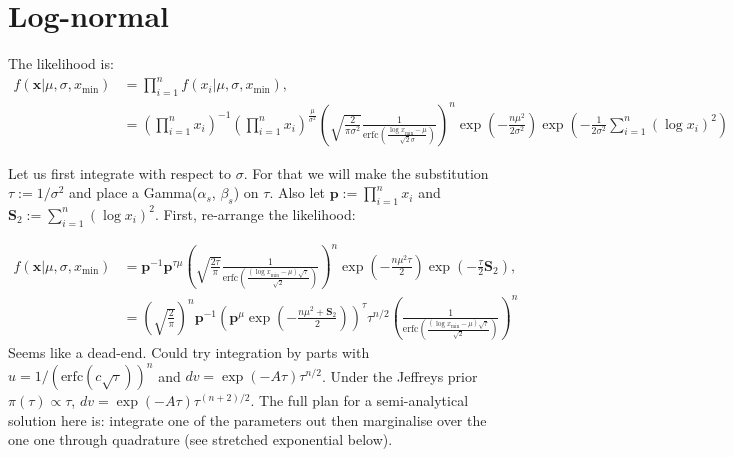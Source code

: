 \documentclass[a4paper, notitlepage, 10pt]{article}
\begin{document}
\section{Log-normal}

The likelihood is:
\begin{align}
 f(\boldsymbol x | \mu, \sigma, x_{\min}) &= \prod_{i = 1}^n f(x_i | \mu, \sigma, x_{\min}), \\
 &= \left(\prod_{i = 1}^n x_i \right)^{-1} \left(\prod_{i = 1}^n x_i \right)^{\frac{\mu}{\sigma^2}} \left( \sqrt{\frac{2}{\pi\sigma^2}} \frac{1}{\text{erfc}\left( \frac{\log x_{\min} - \mu}{\sqrt{2}\sigma} \right)}\right)^n \exp\left( -\frac{n\mu^2}{2\sigma^2} \right) \exp\left(-\frac{1}{2\sigma^2}\sum_{i=1}^n (\log x_i)^2\right) 
\end{align}

Let us first integrate with respect to $\sigma$.
For that we will make the substitution $\tau := 1/\sigma^2$ and place a Gamma($\alpha_s$, $\beta_s$) on $\tau$.
Also let $ \boldsymbol p := \prod_{i = 1}^n x_i$ and $\boldsymbol S_2 := \sum_{i=1}^n (\log x_i)^2$.
First, re-arrange the likelihood:

\begin{align}
  f(\boldsymbol x | \mu, \sigma, x_{\min}) &= \boldsymbol p^{-1} \boldsymbol p^{\tau\mu} \left( \sqrt{\frac{2\tau}{\pi}} \frac{1}{\text{erfc}\left( \frac{(\log x_{\min} - \mu)\sqrt{\tau} }{\sqrt{2}} \right)}\right)^n \exp\left( -\frac{n\mu^2\tau}{2} \right) \exp\left(-\frac{\tau}{2} \boldsymbol S_2 \right), \\
&=  \left(\sqrt{\frac{2}{\pi}}\right)^n\boldsymbol p^{-1} \left( \boldsymbol p^{\mu} \exp\left(-\frac{n\mu^2 + \boldsymbol S_2}{2}\right)  \right)^\tau \tau^{n/2} \left( \frac{1}{\text{erfc}\left( \frac{(\log x_{\min} - \mu)\sqrt{\tau} }{\sqrt{2}} \right)}\right)^n
\end{align}
Seems like a dead-end. 
Could try integration by parts with $u = 1/(\text{erfc}(c\sqrt{\tau}))^n$ and $dv = \exp(-A\tau) \tau^{n/2}$.
Under the Jeffreys prior $\pi(\tau) \propto \tau$, $dv = \exp(-A\tau) \tau^{(n + 2)/2}$.
The full plan for a semi-analytical solution here is: integrate one of the parameters out then marginalise over the one one through quadrature (see stretched exponential below).
\end{document}
